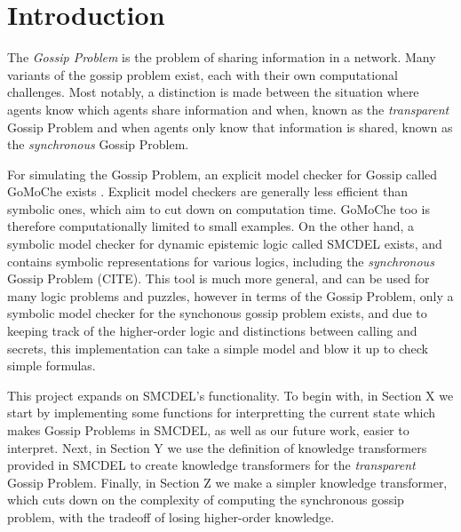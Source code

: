 \section{Introduction}

The \textit{Gossip Problem} is the problem of sharing information in a network. Many variants of the gossip problem exist, each with their own computational challenges. Most notably, a distinction is made between the situation where agents know which agents share information and when, known as the \textit{transparent} Gossip Problem and when agents only know that information is shared, known as the \textit{synchronous} Gossip Problem.

For simulating the Gossip Problem, an explicit model checker for Gossip called GoMoChe exists \cite{gattinger2023gomoche}. Explicit model checkers are generally less efficient than symbolic ones, which aim to cut down on computation time. GoMoChe too is therefore computationally limited to small examples. On the other hand, a symbolic model checker for dynamic epistemic logic called SMCDEL exists, and contains symbolic representations for various logics, including the \textit{synchronous} Gossip Problem (CITE). This tool is much more general, and can be used for many logic problems and puzzles, however in terms of the Gossip Problem, only a symbolic model checker for the synchonous gossip problem exists, and due to keeping track of the higher-order logic and distinctions between calling and secrets, this implementation can take a simple model and blow it up to check simple formulas. 

This project expands on SMCDEL's functionality. To begin with, in Section X we start by implementing some functions for interpretting the current state which makes Gossip Problems in SMCDEL, as well as our future work, easier to interpret. Next, in Section Y we use the definition of knowledge transformers provided in SMCDEL to create knowledge transformers for the \textit{transparent} Gossip Problem. Finally, in Section Z we make a simpler knowledge transformer, which cuts down on the complexity of computing the synchronous gossip problem, with the tradeoff of losing higher-order knowledge.  


